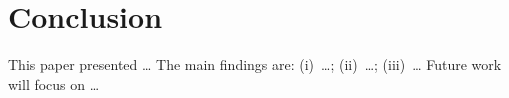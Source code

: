 \documentclass[preprint,12pt,authoryear]{elsarticle}
\begin{document}

\section{Conclusion}
\label{sec:conclusion}


This paper presented \ldots
The main findings are: (i)~\ldots; (ii)~\ldots; (iii)~\ldots
Future work will focus on \ldots


\end{document}
